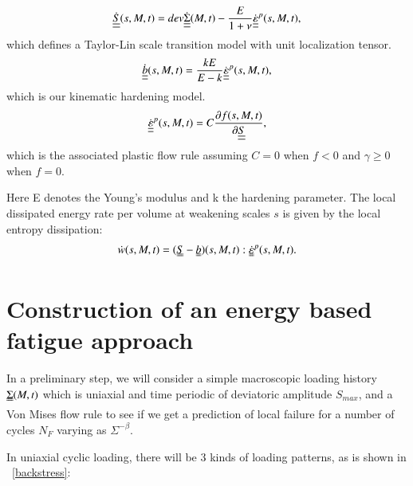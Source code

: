 \documentclass[3p,times,number,review]{elsarticle}
\newcommand{\figref}[1]{\figurename~\ref{#1}}
\begin{document}
	\begin{equation}
    \dot{\uline{\uline{S}}}(s,M,t)=dev\dot{\uline{\uline{\Sigma}}}(M,t)-\dfrac{E}{1+\nu}\dot{\uline{\uline{\varepsilon}}}^p(s,M,t), 
	\end{equation}
     which defines a Taylor-Lin scale transition model with unit localization tensor\cite{Bosia201239}.
		\begin{equation}
		\dot{\uline{\uline{b}}}(s,M,t)=\dfrac{kE}{E-k} \dot{\uline{\uline{\varepsilon}}}^p(s,M,t), 
		\end{equation}
		which is our kinematic hardening model.
		\begin{equation}
		\dot{\uline{\uline{\varepsilon}}}^p(s,M,t)=C\dfrac{\partial f(s,M,t)}{\partial \uline{\uline{S}}}, 
		\end{equation}
		which is the associated plastic flow rule assuming $C=0$ when $f<0$ and  $\gamma\geqslant0$ when $f=0$.

Here E denotes the Young's modulus and k the hardening parameter. The local dissipated energy rate per volume at weakening scales $s$  is given by the local entropy dissipation:
\begin{equation}
	\dot{w}(s,M,t)=(\uuline{S}-\uuline{b})(s,M,t):\uuline{\dot{\varepsilon}}^p(s,M,t).
	\label{dissipated}
\end{equation}

\section{Construction of an energy based fatigue approach}

In a preliminary step, we will consider a simple macroscopic loading history $\uuline{\Sigma}(M, t)$ which is uniaxial
and time periodic of deviatoric amplitude $S_{max}$, and a Von Mises flow rule to see if we get a prediction of local failure for a number of cycles $N_F$ varying as $\Sigma^{-\beta}.$


\noindent
In uniaxial cyclic loading, there will be 3 kinds of loading patterns, as is shown in \figref{backstress}:
\end{document}
